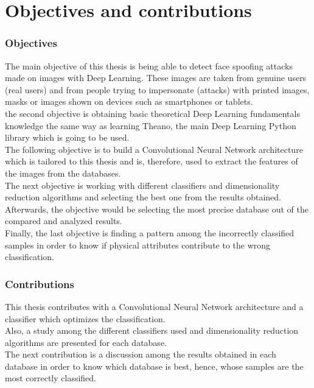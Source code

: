 \section{Objectives and contributions}
\subsubsection{Objectives}
The main objective of this thesis is being able to detect face spoofing attacks made on images with Deep Learning. These images are taken from genuine users (real users) and from people trying to impersonate (attacks) with printed images, masks or images shown on devices such as smartphones or tablets.\\

the second objective is obtaining basic theoretical Deep Learning fundamentals knowledge the same way as learning Theano, the main Deep Learning Python library which is going to be used.\\

The following objective is to build a Convolutional Neural Network architecture which is tailored to this thesis and is, therefore, used to extract the features of the images from the databases.\\

The next objective is working with different classifiers and dimensionality reduction algorithms and selecting the best one from the results obtained.\\

Afterwards, the objective would be selecting the most precise database out of the compared and analyzed results.\\

Finally, the last objective is finding a pattern among the incorrectly classified samples in order to know if physical attributes contribute to the wrong classification.

\subsubsection{Contributions}
This thesis contributes with a Convolutional Neural Network architecture and a classifier which optimizes the classification.\\

Also, a study among the different classifiers used and dimensionality reduction algorithms are presented for each database.\\

The next contribution is a discussion among the results obtained in  each database in order to know which database is best, hence, whose samples are the most correctly classified.


